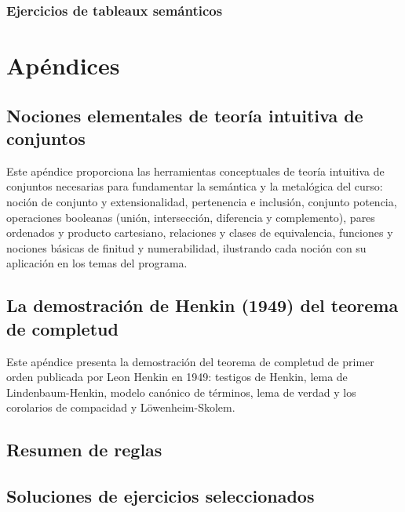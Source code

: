 \documentclass[spanish,11pt,a4paper,openany]{book}
\begin{document}


\section{Ejercicios de tableaux semánticos}


\appendix
\part{Apéndices}

\chapter{Nociones elementales de teoría intuitiva de conjuntos}\label{ap:conjuntos}
\begin{resumentema}
Este apéndice proporciona las herramientas conceptuales de teoría
intuitiva de conjuntos necesarias para fundamentar la semántica y la
metalógica del curso: noción de conjunto y extensionalidad,
pertenencia e inclusión, conjunto potencia, operaciones booleanas
(unión, intersección, diferencia y complemento), pares ordenados y producto cartesiano, relaciones y clases 
de equivalencia, funciones y nociones básicas
de finitud y numerabilidad, ilustrando cada noción con su aplicación
en los temas del programa. 
\end{resumentema}



\chapter{La demostración de Henkin (1949) del teorema de completud}\label{ap:henkin}
\begin{resumentema}
  Este apéndice presenta la demostración del teorema de
  completud de primer orden publicada por Leon Henkin en 1949: testigos de Henkin, lema de Lindenbaum-Henkin, modelo canónico
  de términos, lema de verdad y los corolarios de compacidad y
  Löwenheim-Skolem.
\end{resumentema}



\chapter{Resumen de reglas}\label{ap:reglas}


\chapter{Soluciones de ejercicios seleccionados}\label{ap:soluciones}

\end{document}
